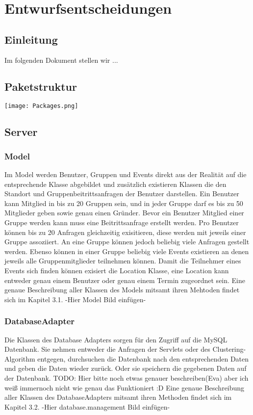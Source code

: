 
\section{Entwurfsentscheidungen}
	\subsection{Einleitung}
	Im folgenden Dokument stellen wir ...
	\subsection{Paketstruktur}
	 \texttt{[image: Packages.png]}
	\subsection{Server}
	\subsubsection{Model}
Im Model werden Benutzer, Gruppen und Events direkt aus der Realität auf die entsprechende Klasse abgebildet und zusätzlich existieren Klassen die den Standort und Gruppenbeitrittsanfragen der Benutzer darstellen.
Ein Benutzer kann Mitglied in bis zu 20 Gruppen sein, und in jeder Gruppe darf es bis zu 50 Mitglieder geben sowie genau einen Gründer. Bevor ein Benutzer Mitglied einer Gruppe werden kann muss eine Beitrittsanfrage erstellt werden.
Pro Benutzer können bis zu 20 Anfragen gleichzeitig exisitieren, diese werden mit jeweils einer Gruppe assoziiert.
An eine Gruppe können jedoch beliebig viele Anfragen gestellt werden.
Ebenso können in einer Gruppe beliebig viele Events existieren an denen jeweils alle Gruppenmitglieder teilnehmen können.
Damit die Teilnehmer eines Events sich finden können exisiert die Location Klasse, eine Location kann entweder genau einem Benutzer oder genau einem Termin zugeordnet sein. 
Eine genaue Beschreibung aller Klassen des Models mitsamt ihren Mehtoden findet sich im Kapitel 3.1.
-Hier Model Bild einfügen-

	\subsubsection{DatabaseAdapter}
	Die Klassen des Database Adapters sorgen für den Zugriff auf die MySQL Datenbank.
Sie nehmen entweder die Anfragen der Servlets oder des Clustering-Algorithm entgegen, durchsuchen die Datenbank nach den entsprechenden Daten und geben die Daten wieder zurück.  
Oder sie speichern die gegebenen Daten auf der Datenbank.
TODO: Hier bitte noch etwas genauer beschreiben(Eva) aber ich weiß immernoch nicht wie genau das Funktioniert :D
Eine genaue Beschreibung aller Klassen des DatabaseAdapters mitsamt ihren Methoden findet sich im Kapitel 3.2.
-Hier database.management Bild einfügen-

